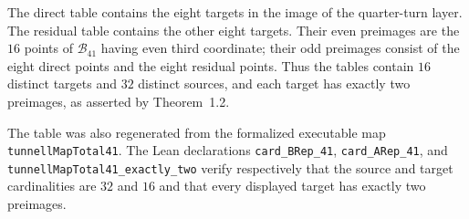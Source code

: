 \documentclass[11pt]{amsart}
\newcommand{\B}{\mathcal B_{41}}
\begin{document}
The direct table contains the eight targets in the image of the quarter-turn
layer.  The residual table contains the other eight targets.  Their even
preimages are the $16$ points of $\B$ having even third coordinate; their odd
preimages consist of the eight direct points and the eight residual points.
Thus the tables contain $16$ distinct targets and $32$ distinct sources, and
each target has exactly two preimages, as asserted by Theorem~1.2.

The table was also regenerated from the formalized executable map
\texttt{tunnellMapTotal41}.  The Lean declarations
\texttt{card\_BRep\_41}, \texttt{card\_ARep\_41}, and
\texttt{tunnellMapTotal41\_exactly\_two} verify respectively that the source
and target cardinalities are $32$ and $16$ and that every displayed target
has exactly two preimages.
\end{document}
